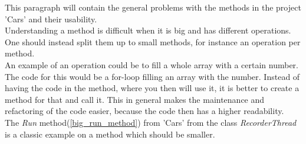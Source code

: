 This paragraph will contain the general problems with the methods in the project 'Cars' and their usability.
\\
Understanding a method is difficult when it is big and has different operations.
One should instead split them up to small methods, for instance an operation per method.
\\
An example of an operation could be to fill a whole array with a certain number.
The code for this would be a for-loop filling an array with the number.
Instead of having the code in the method, where you then will use it, it is better to create a method for that and call it.
This in general makes the maintenance and refactoring of the code easier, because the code then has a higher readability.
\\
The \textit{Run} method(\cref{big_run_method}) from 'Cars' from the class \textit{RecorderThread} is a classic example on a method which should be smaller.